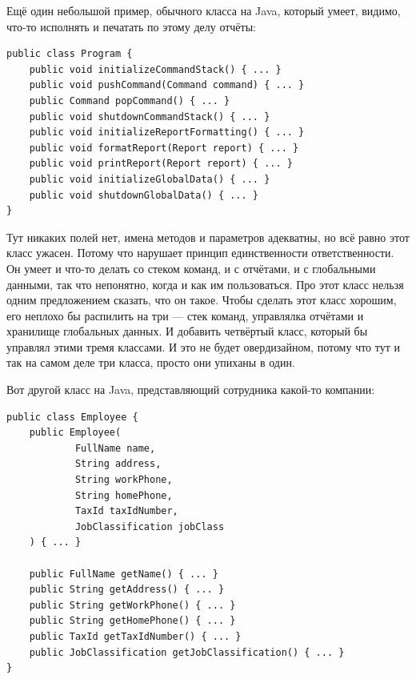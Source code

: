 \documentclass[a5paper]{article}
\begin{document}
Ещё один небольшой пример, обычного класса на Java, который умеет, видимо, что-то исполнять и печатать по этому делу отчёты:

\begin{verbatim}
public class Program {
    public void initializeCommandStack() { ... }
    public void pushCommand(Command command) { ... }
    public Command popCommand() { ... }
    public void shutdownCommandStack() { ... }
    public void initializeReportFormatting() { ... }
    public void formatReport(Report report) { ... }
    public void printReport(Report report) { ... }
    public void initializeGlobalData() { ... }
    public void shutdownGlobalData() { ... }
}
\end{verbatim}

Тут никаких полей нет, имена методов и параметров адекватны, но всё равно этот класс ужасен. Потому что нарушает принцип единственности ответственности. Он умеет и что-то делать со стеком команд, и с отчётами, и с глобальными данными, так что непонятно, когда и как им пользоваться. Про этот класс нельзя одним предложением сказать, что он такое. Чтобы сделать этот класс хорошим, его неплохо бы распилить на три --- стек команд, управлялка отчётами и хранилище глобальных данных. И добавить четвёртый класс, который бы управлял этими тремя классами. И это не будет овердизайном, потому что тут и так на самом деле три класса, просто они упиханы в один.

Вот другой класс на Java, представляющий сотрудника какой-то компании:

\begin{verbatim}
public class Employee {
    public Employee(
            FullName name,
            String address,
            String workPhone,
            String homePhone,
            TaxId taxIdNumber,
            JobClassification jobClass
    ) { ... }

    public FullName getName() { ... }
    public String getAddress() { ... }
    public String getWorkPhone() { ... }
    public String getHomePhone() { ... }
    public TaxId getTaxIdNumber() { ... }
    public JobClassification getJobClassification() { ... }
}
\end{verbatim}
\end{document}
